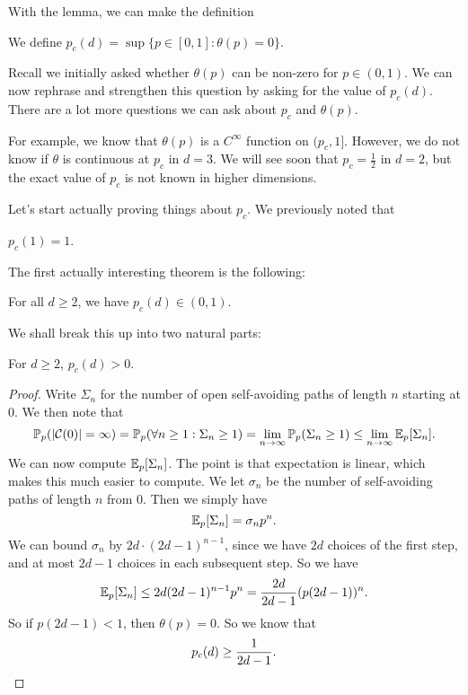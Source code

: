 \documentclass[a4paper]{article}
\begin{document}
With the lemma, we can make the definition
\begin{defi}
  We define $p_c(d) = \sup \{p \in [0, 1]: \theta(p) = 0\}$.
\end{defi}

Recall we initially asked whether $\theta(p)$ can be non-zero for $p \in (0, 1)$. We can now rephrase and strengthen this question by asking for the value of $p_c(d)$. There are a lot more questions we can ask about $p_c$ and $\theta(p)$.

For example, we know that $\theta(p)$ is a $C^\infty$ function on $(p_c, 1]$. However, we do not know if $\theta$ is continuous at $p_c$ in $d = 3$. We will see soon that $p_c = \frac{1}{2}$ in $d = 2$, but the exact value of $p_c$ is not known in higher dimensions.

Let's start actually proving things about $p_c$. We previously noted that
\begin{prop}
  $p_c(1) = 1$.
\end{prop}

The first actually interesting theorem is the following:
\begin{thm}
  For all $d \geq 2$, we have $p_c(d) \in (0, 1)$.
\end{thm}

We shall break this up into two natural parts:
\begin{lemma}
  For $d \geq 2$, $p_c(d) > 0$.
\end{lemma}

\begin{proof}
  Write $\Sigma_n$ for the number of open self-avoiding paths of length $n$ starting at $0$. We then note that
  \[
    \mathbb{P}_p(|\mathcal{C}(0)| = \infty) = \mathbb{P}_p(\forall n \geq 1: \Sigma_n \geq 1) = \lim_{n \to \infty} \mathbb{P}_p(\Sigma_n \geq 1) \leq \lim_{n \to \infty} \mathbb{E}_p[\Sigma_n].
  \]
  We can now compute $\mathbb{E}_p[\Sigma_n]$. The point is that expectation is linear, which makes this much easier to compute. We let $\sigma_n$ be the number of self-avoiding paths of length $n$ from $0$. Then we simply have
  \[
    \mathbb{E}_p[\Sigma_n] = \sigma_n p^n.
  \]
  We can bound $\sigma_n$ by $2d \cdot (2d - 1)^{n - 1}$, since we have $2d$ choices of the first step, and at most $2d - 1$ choices in each subsequent step. So we have
  \[
    \mathbb{E}_p[\Sigma_n] \leq 2d (2d - 1)^{n - 1} p^n = \frac{2d}{2d - 1} (p(2d - 1))^n.
  \]
  So if $p (2d - 1) < 1$, then $\theta(p) = 0$. So we know that
  \[
    p_c(d) \geq \frac{1}{2d - 1}.\qedhere
  \]
\end{proof}
\end{document}
